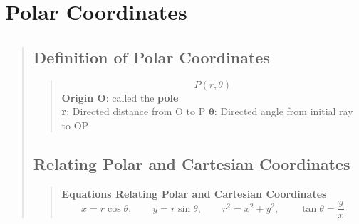 \documentclass{report}
\begin{document}
\section{Polar Coordinates }
\begin{quote}

	\subsection{Definition of Polar Coordinates	}
	\begin{quote}
		$$P(r,\theta)$$
		\textbf{Origin O}: called the \textbf{pole}\\
		\textbf{r}: Directed distance from O to P
		$\mathbf{\theta}$: Directed angle from initial ray to OP 
	\end{quote}

	\subsection{Relating Polar and Cartesian Coordinates}
	\begin{quote}

		\textbf{Equations Relating Polar and Cartesian Coordinates}\\
		$$x = r\cos \theta,\qquad y = r\sin \theta, \qquad r^2 = x^2 + y^2, \qquad \tan \theta =\frac{y}{x}$$

	\end{quote}

\end{quote}

\end{document}
